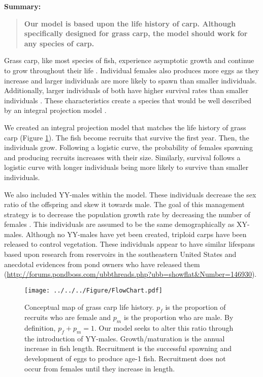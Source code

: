 \documentclass{article}[12pt]
\begin{document}
\textbf{Summary:}
\begin{verse}
\textbf{
Our model is based upon the life history of carp.
Although specifically designed for grass carp, the model should work for any species of carp. 
} 
\end{verse}

Grass carp, like most species of fish, experience asymptotic growth and continue to grow throughout their life  \citep{lagler1962john}.
Individual females also produces more eggs as they increase and larger individuals are more likely to spawn than smaller individuals.
Additionally, larger individuals of both have higher survival rates than smaller individuals \citep{shireman1983synopsis}. 
These characteristics create a species that would be well described by an integral projection model \citep{ellner2006integral, ramula2009integral, merow2014advancing}.  

We created an integral projection model that matches the life history of grass carp (Figure \ref{fig:cMap}).
The fish become recruits that survive the first year.
Then, the individuals grow. 
Following a logistic curve, the probability of females spawning and producing recruits increases with their size. 
Similarly, survival follows a logistic curve with longer individuals being more likely to survive than smaller individuals.

We also included YY-males within the model.
These individuals decrease the sex ratio of the offspring and skew it towards male.
The goal of this management strategy is to decrease the population growth rate by decreasing the number of females \citep{schill2016production}. 
This individuals are assumed to be the same demographically as XY-males.
Although no YY-males have yet been created, triploid carps have been released to control vegetation.
These individuals appear to have similar lifespans based upon research from reservoirs in the southeastern United States \citep{kirk2003longevity} and anecdotal evidences from pond owners who have released them (\url{http://forums.pondboss.com/ubbthreads.php?ubb=showflat&Number=146930}).

\begin{figure}[htbp]
	\centering
	\texttt{[image: ../../../Figure/FlowChart.pdf]} 
	   \caption{Conceptual map of grass carp life history. \(p_f\) is the proportion of recruits who are female and \(p_m\) is the proportion who are male. By definition, \(p_f + p_m = 1\).  Our model seeks to alter this ratio through the introduction of YY-males. Growth/maturation is the annual increase in fish length. Recruitment is the successful spawning and development of eggs to produce age-1 fish. Recruitment does not occur from females until they increase in length.}
   \label{fig:cMap}
\end{figure}
\end{document}
